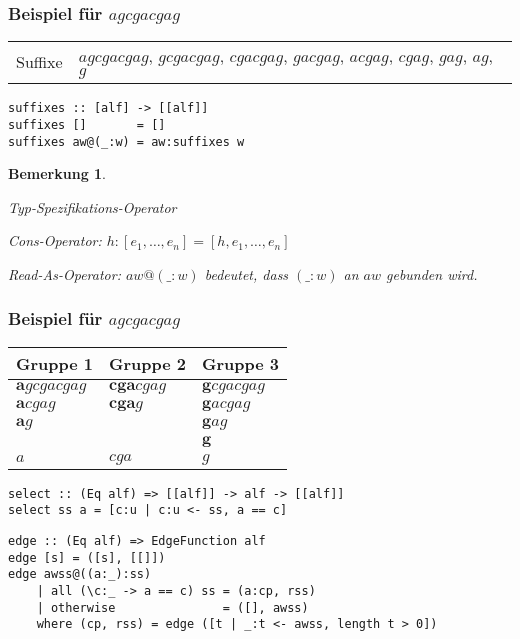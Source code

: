 \documentclass{beamer}
\newtheorem{remark}{Bemerkung}
\begin{document}
\begin{frame}[fragile]
\frametitle{Beispiel für $agcgacgag$}
\begin{tabularx}{\textwidth}{l X}
Suffixe &  $agcgacgag$, $gcgacgag$, $cgacgag$, $gacgag$, $acgag$, $cgag$, $gag$, $ag$, $g$ \\
\end{tabularx}
\medskip
\begin{lstlisting}
suffixes :: [alf] -> [[alf]]
suffixes []       = []
suffixes aw@(_:w) = aw:suffixes w
\end{lstlisting}
\bigskip
\begin{remark}
\begin{description}[l]
    \item[Operator $(::)$] Typ-Spezifikations-Operator
    \item[Operator $(:)$] Cons-Operator: $h:[e_1, \dots, e_n] = [h, e_1, \dots, e_n]$
    \item[Operator $(@)$] Read-As-Operator: $aw@(\_:w)$ bedeutet, dass $(\_:w)$ an $aw$ gebunden wird.
\end{description}
\end{remark}
\end{frame}

\begin{frame}[fragile]
\frametitle{Beispiel für $agcgacgag$}
\begin{table}
\begin{tabular}{l l l}
    \toprule
    Gruppe 1                 & Gruppe 2               & Gruppe 3                \\
    \midrule
    $\boldsymbol{a}gcgacgag$ & $\boldsymbol{cga}cgag$ & $\boldsymbol{g}cgacgag$ \\
    $\boldsymbol{a}cgag$     & $\boldsymbol{cga}g$    & $\boldsymbol{g}acgag$   \\
    $\boldsymbol{a}g$        &                        & $\boldsymbol{g}ag$      \\
                             &                        & $\boldsymbol{g}$        \\
    \midrule
    $a$                      & $cga$                  & $g$                     \\
    \bottomrule
\end{tabular}
\end{table}
\begin{lstlisting}
select :: (Eq alf) => [[alf]] -> alf -> [[alf]]
select ss a = [c:u | c:u <- ss, a == c]
\end{lstlisting}
\begin{lstlisting}
edge :: (Eq alf) => EdgeFunction alf
edge [s] = ([s], [[]])
edge awss@((a:_):ss)
    | all (\c:_ -> a == c) ss = (a:cp, rss)
    | otherwise               = ([], awss)
    where (cp, rss) = edge ([t | _:t <- awss, length t > 0])
\end{lstlisting}
\end{frame}
\end{document}

